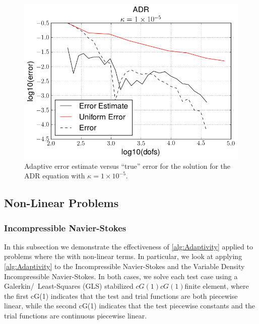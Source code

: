 \begin{test}[Convection Dominated ADR, $\kappa = 1\times10^{-5}$]
    \begin{figure}[h]
        \centering
        \includegraphics[scale=0.5]{Figures/AdaptiveADRkappa1E-5.png}
        \caption{Adaptive error estimate versus ``true'' error for the solution
            for the ADR equation with $\kappa=1\times 10^{-5}$.}
        \label{fig:ADRk1E-5_err}
    \end{figure}

\end{test}

\subsection{Non-Linear Problems}

\subsubsection{Incompressible Navier-Stokes}

In this subsection we demonstrate the effectiveness of \autoref{alg:Adaptivity}
applied to problems where the with non-linear terms. In particular, we look at
applying \autoref{alg:Adaptivity} to the Incompressible Navier-Stokes and the
Variable Density Incompressible Navier-Stokes. In both cases, we solve each test
case using a Galerkin\slash~Least-Squares (GLS) stabilized $cG(1)cG(1)$finite
element, where the first cG(1) indicates that the test and trial functions are
both piecewise linear, while the second cG(1) indicates that the test piecewise
constants and the trial functions are continuous piecewise linear.

